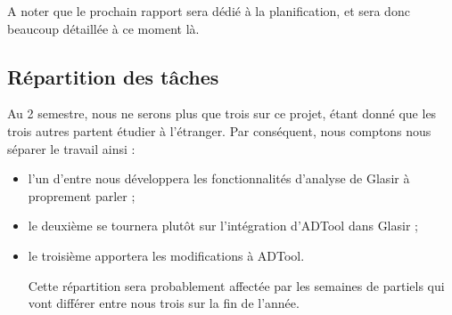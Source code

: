 		A noter que le prochain rapport sera dédié à la planification, et sera donc beaucoup détaillée à ce moment là.


	\subsection{Répartition des tâches}
	Au 2 semestre, nous ne serons plus que trois sur ce projet, étant donné que les trois autres partent étudier à l'étranger. Par conséquent, nous comptons nous séparer le travail ainsi :
	\begin{itemize}
	\item l'un d'entre nous développera les fonctionnalités d'analyse de Glasir à proprement parler ;
	\item le deuxième se tournera plutôt sur l'intégration d'ADTool dans Glasir ;
	\item le troisième apportera les modifications à ADTool.
	
	Cette répartition sera probablement affectée par les semaines de partiels qui vont différer entre nous trois sur la fin de l'année.
	\end{itemize}
